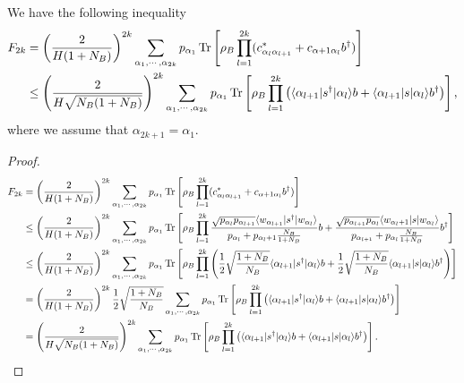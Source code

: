 \documentclass[../../note.tex]{subfiles}
\begin{document}
\begin{lemma}
    We have the following inequality
    \begin{align}
        F_{2k} 
        &= \left(\frac{2}{H(1+N_B)}\right)^{2k} \sum_{\alpha_1, \cdots, \alpha_{2k}} p_{\alpha_1} \operatorname{Tr}\left[\rho_B \prod_{l=1}^{2k}(c_{\alpha_l \alpha_{l+1}}^\ast + c_{\alpha+1 \alpha_l} b^\dagger )\right] \\
        &\leq \left( \frac{2}{H\sqrt{N_B(1+N_B)}} \right)^{2k} \sum_{\alpha_1, \cdots, \alpha_{2k}} p_{\alpha_1} \operatorname{Tr}\left[\rho_B \prod_{l=1}^{2k} \left(\langle \alpha_{l+1} \vert s^\dagger \vert \alpha_l \rangle b + \langle \alpha_{l+1} \vert s \vert \alpha_l \rangle b^\dagger \right)\right],
    \end{align}
    where we assume that $\alpha_{2k+1} = \alpha_1$.
\end{lemma}
\begin{proof}
    \begin{align}
        F_{2k}
        &= \left(\frac{2}{H(1+N_B)}\right)^{2k} \sum_{\alpha_1, \cdots, \alpha_{2k}} p_{\alpha_1} \operatorname{Tr}\left[\rho_B \prod_{l=1}^{2k}(c_{\alpha_l \alpha_{l+1}}^\ast + c_{\alpha+1 \alpha_l} b^\dagger )\right] \\
        &\leq \left(\frac{2}{H(1+N_B)}\right)^{2k} \sum_{\alpha_1, \cdots, \alpha_{2k}} p_{\alpha_1} \operatorname{Tr}\left[\rho_B \prod_{l=1}^{2k} \frac{\sqrt{p_{\alpha_l} p_{\alpha_{l+1}}}\langle w_{\alpha_{l+1}} \vert s^\dagger \vert w_{\alpha_l} \rangle}{p_{\alpha_l} + p_{\alpha_l + 1}\frac{N_B}{1+N_B}} b + \frac{\sqrt{p_{\alpha_{l+1}} p_{\alpha_l}}\langle w_{\alpha_l+1} \vert s \vert w_{\alpha_l} \rangle}{p_{\alpha_{l+1}} + p_{\alpha_l}\frac{N_B}{1+N_B}} b^\dagger \right] \\
        &\leq \left(\frac{2}{H(1+N_B)}\right)^{2k} \sum_{\alpha_1, \cdots, \alpha_{2k}} p_{\alpha_1} \operatorname{Tr}\left[\rho_B \prod_{l=1}^{2k} \left(\frac{1}{2} \sqrt{\frac{1+N_B}{N_B}} \langle \alpha_{l+1} \vert s^\dagger \vert \alpha_l \rangle b + \frac{1}{2}\sqrt{\frac{1+N_B}{N_B}} \langle \alpha_{l+1} \vert s \vert \alpha_l \rangle b^\dagger \right)\right] \\
        &= \left(\frac{2}{H(1+N_B)}\right)^{2k} \frac{1}{2}\sqrt{\frac{1+N_B}{N_B}}\sum_{\alpha_1, \cdots, \alpha_{2k}} p_{\alpha_1} \operatorname{Tr}\left[\rho_B \prod_{l=1}^{2k} \left(\langle \alpha_{l+1} \vert s^\dagger \vert \alpha_l \rangle b + \langle \alpha_{l+1} \vert s \vert \alpha_l \rangle b^\dagger \right)\right] \\
        &= \left( \frac{2}{H\sqrt{N_B(1+N_B)}} \right)^{2k} \sum_{\alpha_1, \cdots, \alpha_{2k}} p_{\alpha_1} \operatorname{Tr}\left[\rho_B \prod_{l=1}^{2k} \left(\langle \alpha_{l+1} \vert s^\dagger \vert \alpha_l \rangle b + \langle \alpha_{l+1} \vert s \vert \alpha_l \rangle b^\dagger \right)\right].
    \end{align}
\end{proof}
\end{document}
